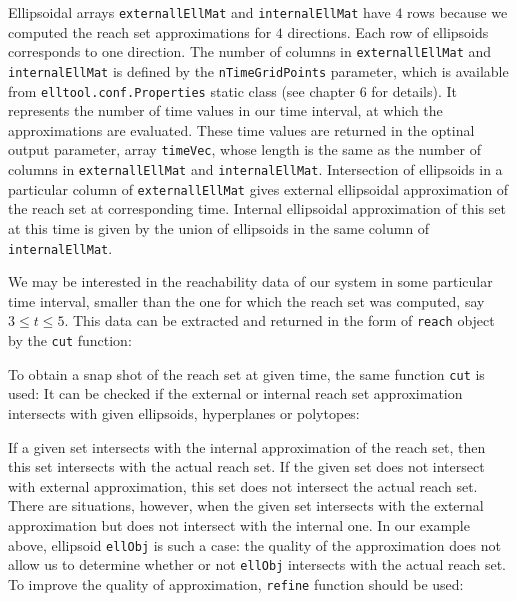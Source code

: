 Ellipsoidal arrays {\tt externallEllMat} and {\tt internalEllMat} have $4$ rows because we computed
the reach set approximations for $4$ directions. Each row of ellipsoids
corresponds to one direction. The number of columns in {\tt externallEllMat} and {\tt internalEllMat}
is defined by the {\tt nTimeGridPoints} parameter, which is available from {\tt elltool.conf.Properties}
static class (see chapter 6 for details). It represents the number of time values
in our time interval, at which the approximations are evaluated. These
time values are returned in the optinal output parameter, array {\tt timeVec},
whose length is the same as the number of columns in {\tt externallEllMat} and {\tt internalEllMat}.
Intersection of ellipsoids in a particular column of {\tt externallEllMat} gives
external ellipsoidal approximation of the reach set at corresponding time.
Internal ellipsoidal approximation of this set at this time is given by the
union of ellipsoids in the same column of {\tt internalEllMat}.

We may be interested in the reachability data of our system in some
particular time interval, smaller than the one for which the reach set was
computed, say $3\leq t\leq5$.
This data can be extracted and returned in the form of {\tt reach}
object by the {\tt cut} function:

To obtain a snap shot of the reach set at given time, the same function
{\tt cut} is used:
It can be checked if the external or internal reach set approximation
intersects with given ellipsoids, hyperplanes or polytopes:




If a given set intersects with the internal approximation of the reach set,
then this set intersects with the actual reach set.
If the given set does not
intersect with external approximation, this set does not
intersect the actual reach set. There are situations, however, when the
given set intersects with the external approximation but does not intersect
with the internal one. In our example above, ellipsoid {\tt ellObj} is such a case:
the quality of the approximation does not allow us to determine whether or not
{\tt ellObj} intersects with the actual reach set. To improve the quality
of approximation, {\tt refine} function should be used:

